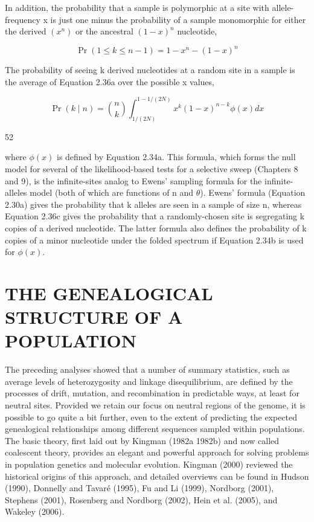 \documentclass{article}
\begin{document}
In addition, the probability that a sample is polymorphic at a site with allele-frequency x is just one minus the probability of a sample monomorphic for either the derived  $ (x^{n}) $ or the ancestral  $ (1 - x)^{n} $ nucleotide,

\begin{equation}
\Pr(1\leq k\leq n-1)=1-x^{n}-(1-x)^{n}
\tag{2.36b}
\label{eq:2_36b}
\end{equation}

The probability of seeing k derived nucleotides at a random site in a sample is the average of Equation 2.36a over the possible x values,

\begin{equation}
\Pr(k\mid n)=\binom{n}{k}\int_{1/(2N)}^{1-1/(2N)}x^{k}(1-x)^{n-k}\phi(x)dx
\tag{2.36c}
\label{eq:2_36c}
\end{equation}

52

where  $ \phi(x) $ is defined by Equation 2.34a. This formula, which forms the null model for several of the likelihood-based tests for a selective sweep (Chapters 8 and 9), is the infinite-sites analog to Ewens' sampling formula for the infinite-alleles model (both of which are functions of n and  $ \theta $). Ewens' formula (Equation 2.30a) gives the probability that k alleles are seen in a sample of size n, whereas Equation 2.36c gives the probability that a randomly-chosen site is segregating k copies of a derived nucleotide. The latter formula also defines the probability of k copies of a minor nucleotide under the folded spectrum if Equation 2.34b is used for  $ \phi(x) $.

\section{THE GENEALOGICAL STRUCTURE OF A POPULATION}
The preceding analyses showed that a number of summary statistics, such as average levels of heterozygosity and linkage disequilibrium, are defined by the processes of drift, mutation, and recombination in predictable ways, at least for neutral sites. Provided we retain our focus on neutral regions of the genome, it is possible to go quite a bit further, even to the extent of predicting the expected genealogical relationships among different sequences sampled within populations. The basic theory, first laid out by Kingman (1982a 1982b) and now called coalescent theory, provides an elegant and powerful approach for solving problems in population genetics and molecular evolution. Kingman (2000) reviewed the historical origins of this approach, and detailed overviews can be found in Hudson (1990), Donnelly and Tavaré (1995), Fu and Li (1999), Nordborg (2001), Stephens (2001), Rosenberg and Nordborg (2002), Hein et al. (2005), and Wakeley (2006).
\end{document}
